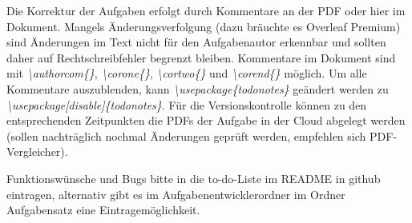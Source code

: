 \documentclass[./main.tex]{subfiles}
\begin{document}
\bigskip
Die Korrektur der Aufgaben erfolgt durch Kommentare an der PDF oder hier im Dokument. Mangels \"Anderungsverfolgung (dazu br\"auchte es Overleaf Premium) sind \"Anderungen im Text nicht f\"ur den Aufgabenautor erkennbar und sollten daher auf Rechtschreibfehler begrenzt bleiben. Kommentare im Dokument sind mit \textit{\hypertarget{authorcom}{\textbackslash authorcom\{\}}}, \textit{\hypertarget{corone}{\textbackslash corone\{\}}}, \textit{\hypertarget{cortwo}{\textbackslash cortwo\{\}}} und \textit{\hypertarget{corend}{\textbackslash corend\{\}}} m\"oglich. Um alle Kommentare auszublenden, kann \textit{\textbackslash usepackage\{todonotes\}} ge\"andert werden zu \textit{\textbackslash usepackage[disable]\{todonotes\}}. F\"ur die Versionskontrolle k\"onnen zu den entsprechenden Zeitpunkten die PDFs der Aufgabe in der Cloud abgelegt werden (sollen nachtr\"aglich nochmal \"Anderungen gepr\"uft werden, empfehlen sich PDF-Vergleicher). 

\bigskip
Funktionsw\"unsche und Bugs bitte in die to-do-Liste im README in github eintragen, alternativ gibt es im Aufgabenentwicklerordner im Ordner Aufgabensatz eine Eintragem\"oglichkeit. 
\end{document}
